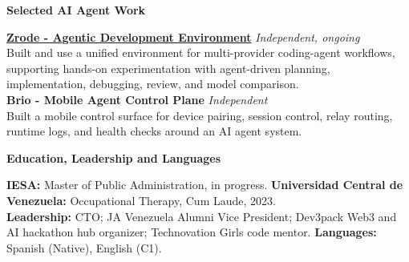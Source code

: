 \documentclass[10pt]{article}
\newcommand{\sectiontitle}[1]{%
    \vspace{3pt}
    \begin{center}
        \textbf{#1}
    \end{center}
    \vspace{-7pt}
}
\begin{document}
\sectiontitle{Selected AI Agent Work}
\textbf{\href{https://github.com/0bkevin/zrode}{Zrode - Agentic Development Environment}} \hfill \textit{Independent, ongoing} \\
Built and use a unified environment for multi-provider coding-agent workflows, supporting hands-on experimentation with agent-driven planning, implementation, debugging, review, and model comparison. \\
\textbf{Brio - Mobile Agent Control Plane} \hfill \textit{Independent} \\
Built a mobile control surface for device pairing, session control, relay routing, runtime logs, and health checks around an AI agent system.

\sectiontitle{Education, Leadership and Languages}
\textbf{IESA:} Master of Public Administration, in progress. \textbf{Universidad Central de Venezuela:} Occupational Therapy, Cum Laude, 2023. \\
\textbf{Leadership:} CTO; JA Venezuela Alumni Vice President; Dev3pack Web3 and AI hackathon hub organizer; Technovation Girls code mentor. \textbf{Languages:} Spanish (Native), English (C1).
\end{document}
